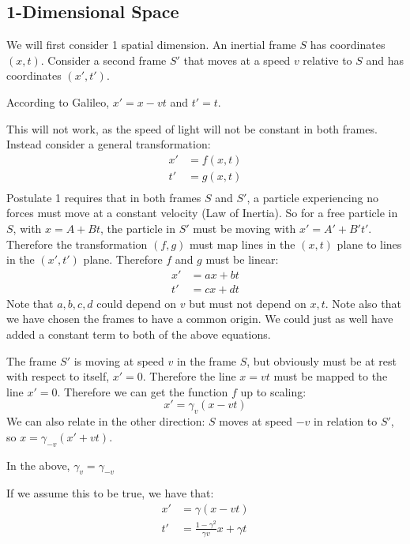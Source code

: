 \documentclass[../Main.tex]{subfiles}
\begin{document}
\subsection{1-Dimensional Space}
We will first consider 1 spatial dimension. An inertial frame $S$ has coordinates $(x, t)$. Consider a second frame $S'$ that moves at a speed $v$ relative to $S$ and has coordinates $(x', t')$.\par
According to Galileo, $x' = x - vt$ and $t' = t$.\par
This will not work, as the speed of light will not be constant in both frames. Instead consider a general transformation:
\begin{align*}
    x' &= f(x, t) \\
    t' &= g(x, t) \\
\end{align*}
Postulate 1 requires that in both frames $S$ and $S'$, a particle experiencing no forces must move at a constant velocity (Law of Inertia). So for a free particle in $S$, with $x = A + Bt$, the particle in $S'$ must be moving with $x' = A' + B't'$. Therefore the transformation $(f, g)$ must map lines in the $(x, t)$ plane to lines in the $(x', t')$ plane. Therefore $f$ and $g$ must be linear:
\begin{align*}
    x' &= ax + bt \\
    t' &= cx + dt
\end{align*}
Note that $a, b, c, d$ could depend on $v$ but must not depend on $x, t$. Note also that we have chosen the frames to have a common origin. We could just as well have added a constant term to both of the above equations.\par
The frame $S'$ is moving at speed $v$ in the frame $S$, but obviously must be at rest with respect to itself, $x' = 0$. Therefore the line $x = vt$ must be mapped to the line $x' = 0$. Therefore we can get the function $f$ up to scaling:
\begin{equation*}
    x' = \gamma_v (x - vt)
\end{equation*}
We can also relate in the other direction: $S$ moves at speed $-v$ in relation to $S'$, so $x = \gamma_{-v} (x' + vt)$.
\begin{proposition}
    In the above, $\gamma_v = \gamma_{-v}$
\end{proposition}
If we assume this to be true, we have that:
\begin{align}
    x' &= \gamma(x - vt) \\
    t' &= \frac{1-\gamma^2}{\gamma v} x + \gamma t
\end{align}
\end{document}
